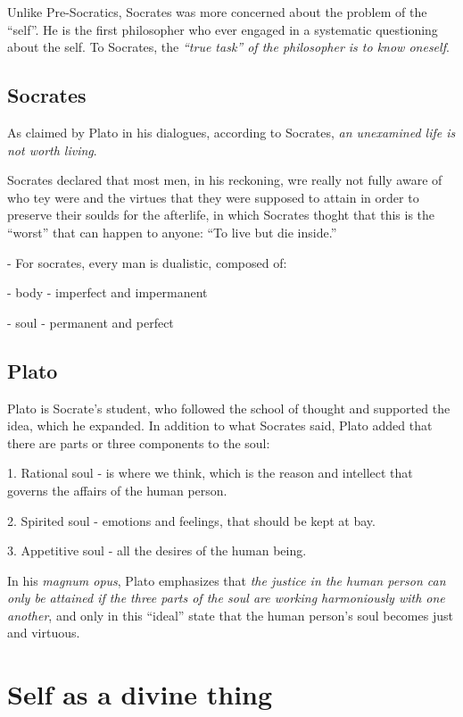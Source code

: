 \documentclass[12pt, UTF8]{article}
\begin{document}
	Unlike Pre-Socratics, Socrates was more concerned about the problem of the ``self''. He is the first philosopher who ever engaged in a systematic questioning about the self. To Socrates, the \textit{``true task''  of the philosopher is to know oneself}.
	
	\subsection*{Socrates}
	
	As claimed by Plato in his dialogues, according to Socrates, \emph{an unexamined life is not worth living}.
	
	Socrates declared that most men, in his reckoning, wre really not fully aware of who tey were and the virtues that they were supposed to attain in order to preserve their soulds for the afterlife, in which Socrates thoght that this is the ``worst'' that can happen to anyone: ``To live but die inside.''
	
	- For socrates, every man is dualistic, composed of:
	
	- body - imperfect and impermanent
	
	- soul - permanent and perfect
	
	\subsection*{Plato}
	
	Plato is Socrate's student, who followed the school of thought and supported the idea, which he expanded. In addition to what Socrates said, Plato added that there are parts or three components to the soul:
	
	1. Rational soul - is where we think, which is the reason and intellect that governs the affairs of the human person.
	
	2. Spirited soul - emotions and feelings, that should be kept at bay.
	
	3. Appetitive soul - all the desires of the human being.
	
	In his \textit{magnum opus}, Plato emphasizes that \emph{the justice in the human person can only be attained if the three parts of the soul are working harmoniously with one another}, and only in this ``ideal'' state that the human person's soul becomes just and virtuous.
	
	\section{Self as a divine thing}
	
\end{document}
